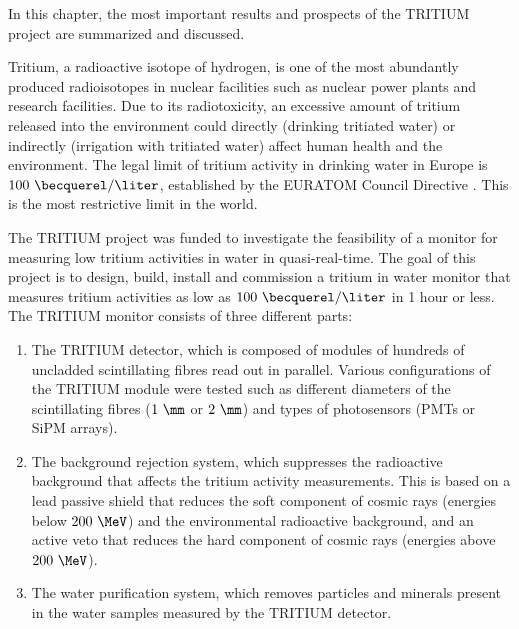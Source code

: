In this chapter, the most important results and prospects of the TRITIUM project are summarized and discussed. 

Tritium, a radioactive isotope of hydrogen, is one of the most abundantly produced radioisotopes in nuclear facilities such as nuclear power plants and research facilities. Due to its radiotoxicity, an excessive amount of tritium released into the environment could directly (drinking tritiated water) or indirectly (irrigation with tritiated water) affect human health and the environment. The legal limit of tritium activity in drinking water in Europe is $100~\becquerel/\liter$, established by the EURATOM Council Directive \cite{EURATOM_GL}. This is the most restrictive limit in the world. %

The TRITIUM project was funded to investigate the feasibility of a monitor 
for measuring low tritium activities in water in quasi-real-time. The goal of this project is to design, build, install and commission a tritium in water monitor that measures tritium activities as low as $100~\becquerel/\liter$ in 1 hour or less. The TRITIUM monitor consists of three different parts:

\begin{enumerate}

\item{} The TRITIUM detector, which is composed of modules of hundreds of uncladded scintillating fibres read out in parallel. Various configurations of the TRITIUM module were tested such as different diameters of the scintillating fibres ($1~\mm$ or $2~\mm$) and types of photosensors (PMTs or SiPM arrays).

\item{} The background rejection system, which suppresses the radioactive background that affects the tritium activity measurements. This is based on a lead passive shield that reduces the soft component of cosmic rays (energies below $200~\MeV$) and the environmental radioactive background, and an active veto that reduces the hard component of cosmic rays (energies above $200~\MeV$).

\item{} The water purification system, which removes particles and minerals present in the water samples measured by the TRITIUM detector.

\end{enumerate} 


